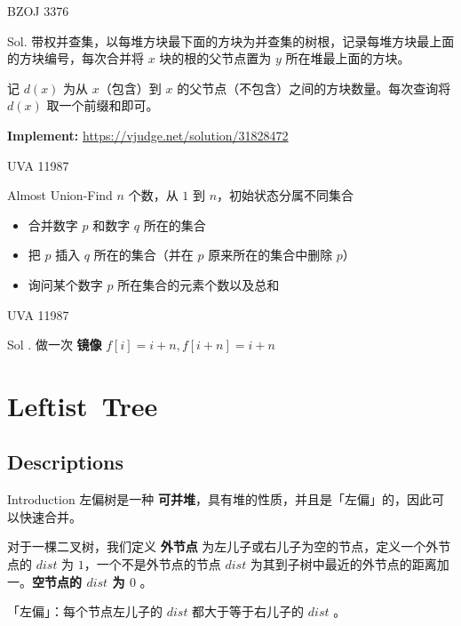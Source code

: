 \documentclass{beamer}
\begin{document}
\begin{frame}[fragile]{BZOJ 3376}
    \begin{block}{Sol.}
    带权并查集，以每堆方块最下面的方块为并查集的树根，记录每堆方块最上面的方块编号，每次合并将 $x$ 块的根的父节点置为 $y$ 所在堆最上面的方块。
    
    记 $d(x)$ 为从 $x$（包含）到 $x$ 的父节点（不包含）之间的方块数量。每次查询将 $d(x)$ 取一个前缀和即可。
  \end{block}

  \textbf{Implement:} \url{https://vjudge.net/solution/31828472}
\end{frame}

\begin{frame}{UVA 11987}
  \begin{block}{Almost Union-Find}
  $n$ 个数，从 $1$ 到 $n$，初始状态分属不同集合

  \begin{itemize}
    \item 合并数字 $p$ 和数字 $q$ 所在的集合
    \item 把 $p$ 插入 $q$ 所在的集合（并在 $p$ 原来所在的集合中删除 $p$）
    \item 询问某个数字 $p$ 所在集合的元素个数以及总和
  \end{itemize}
  \end{block}

\end{frame}

\begin{frame}{UVA 11987}
 \begin{block}{Sol .}
   做一次 \textbf{镜像}
   $f[i] = i + n, f[i + n] = i + n$
 \end{block}
\end{frame}


\section{Leftist\ Tree}
\subsection{Descriptions}
\begin{frame}{Introduction}
  左偏树是一种 \textbf{可并堆}，具有堆的性质，并且是「左偏」的，因此可以快速合并。
  
  \pause
  对于一棵二叉树，我们定义 \textbf{外节点} 为左儿子或右儿子为空的节点，定义一个外节点的 $dist$ 为 $1$，一个不是外节点的节点 $dist$ 为其到子树中最近的外节点的距离加一。\textbf{空节点的 $dist$ 为 $0$} 。
  
  「左偏」：每个节点左儿子的 $dist$ 都大于等于右儿子的 $dist$ 。
\end{frame}
\end{document}

